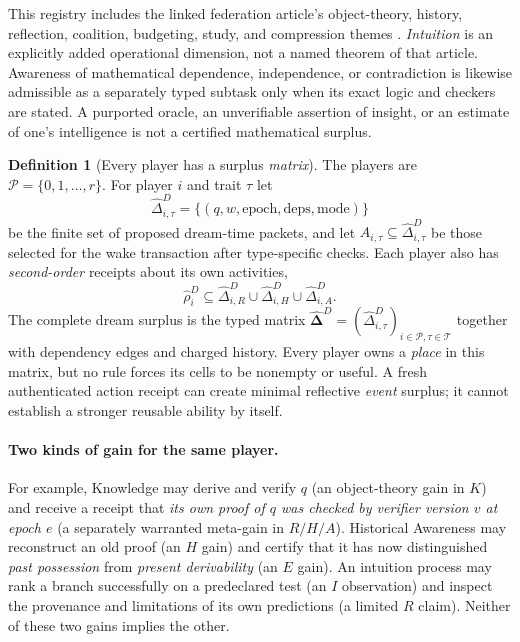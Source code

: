 \documentclass[11pt,letterpaper]{article}
\theoremstyle{definition}
\newtheorem{definition}{Definition}[section]
\theoremstyle{plain}
\theoremstyle{definition}
\begin{document}
This registry includes the linked federation article's object-theory, history, reflection, coalition, budgeting, study, and compression themes \cite{tenneson-five}. \emph{Intuition} is an explicitly added operational dimension, not a named theorem of that article. Awareness of mathematical dependence, independence, or contradiction is likewise admissible as a separately typed subtask only when its exact logic and checkers are stated. A purported oracle, an unverifiable assertion of insight, or an estimate of one's intelligence is not a certified mathematical surplus.

\begin{definition}[Every player has a surplus \emph{matrix}]
The players are $\mathcal P=\{0,1,\ldots,r\}$. For player $i$ and trait $\tau$ let
\[
\widehat\Delta_{i,\tau}^{D}=\{(q,w,\mathrm{epoch},\mathrm{deps},\mathrm{mode})\}
\]
be the finite set of proposed dream-time packets, and let $A_{i,\tau}\subseteq\widehat\Delta_{i,\tau}^{D}$ be those selected for the wake transaction after type-specific checks. Each player also has \emph{second-order} receipts about its own activities,
\[
\widehat\rho_i^{D}\subseteq\widehat\Delta_{i,R}^{D}\cup\widehat\Delta_{i,H}^{D}\cup\widehat\Delta_{i,A}^{D}.
\]
The complete dream surplus is the typed matrix $\widehat{\boldsymbol\Delta}^{D}=(\widehat\Delta_{i,\tau}^{D})_{i\in\mathcal P,\tau\in\mathcal T}$ together with dependency edges and charged history. Every player owns a \emph{place} in this matrix, but no rule forces its cells to be nonempty or useful. A fresh authenticated action receipt can create minimal reflective \emph{event} surplus; it cannot establish a stronger reusable ability by itself.
\end{definition}

\paragraph{Two kinds of gain for the same player.}
For example, Knowledge may derive and verify $q$ (an object-theory gain in $K$) and receive a receipt that \emph{its own proof of $q$ was checked by verifier version $v$ at epoch $e$} (a separately warranted meta-gain in $R/H/A$). Historical Awareness may reconstruct an old proof (an $H$ gain) and certify that it has now distinguished \emph{past possession} from \emph{present derivability} (an $E$ gain). An intuition process may rank a branch successfully on a predeclared test (an $I$ observation) and inspect the provenance and limitations of its own predictions (a limited $R$ claim). Neither of these two gains implies the other.
\end{document}
